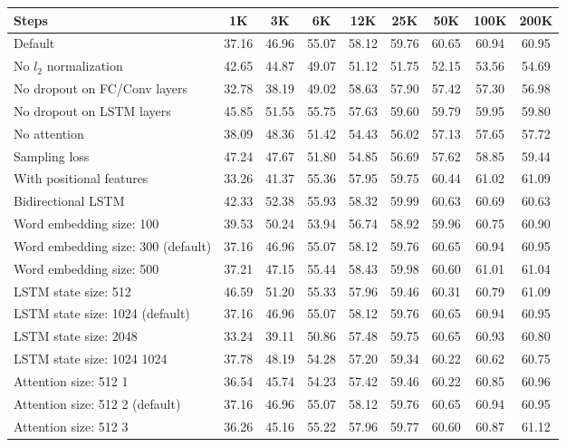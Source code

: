 \documentclass[10pt,twocolumn,letterpaper]{article}
\begin{document}
\begin{table*}
	\footnotesize
	\centering
	\tabcolsep=0.5cm
	\begin{tabular}{l c c c c c c c c}
		\toprule
		Steps &  1K & 3K & 6K & 12K & 25K & 50K & 100K & 200K \\
		\midrule
		Default & 37.16 & 46.96 & 55.07 & 58.12 & 59.76 & 60.65 & 60.94 & 60.95 \\
		No $l_2$ normalization & 42.65 & 44.87 & 49.07 & 51.12 & 51.75 & 52.15 & 53.56 & 54.69 \\
		No dropout on FC/Conv layers & 32.78 & 38.19 & 49.02 & 58.63 & 57.90 & 57.42 & 57.30 & 56.98 \\
		No dropout on LSTM layers & 45.85 & 51.55 & 55.75 & 57.63 & 59.60 & 59.79 & 59.95 & 59.80 \\
		No attention & 38.09 & 48.36 & 51.42 & 54.43 & 56.02 & 57.13 & 57.65 & 57.72 \\
		Sampling loss & 47.24 & 47.67 & 51.80 & 54.85 & 56.69 & 57.62 & 58.85 & 59.44 \\
		With positional features & 33.26 & 41.37 & 55.36 & 57.95 & 59.75 & 60.44 & 61.02 & 61.09 \\
		Bidirectional LSTM & 42.33 & 52.38 & 55.93 & 58.32 & 59.99 & 60.63 & 60.69 & 60.63 \\
		\midrule
		Word embedding size: 100 & 39.53 & 50.24 & 53.94 & 56.74 & 58.92 & 59.96 & 60.75 & 60.90 \\
		Word embedding size: 300 (default) & 37.16 & 46.96 & 55.07 & 58.12 & 59.76 & 60.65 & 60.94 & 60.95 \\
		Word embedding size: 500 & 37.21 & 47.15 & 55.44 & 58.43 & 59.98 & 60.60 & 61.01 & 61.04 \\
		\midrule
		LSTM state size: 512 & 46.59 & 51.20 & 55.33 & 57.96 & 59.46 & 60.31 & 60.79 & 61.09 \\
		LSTM state size: 1024 (default) & 37.16 & 46.96 & 55.07 & 58.12 & 59.76 & 60.65 & 60.94 & 60.95 \\
		LSTM state size: 2048 & 33.24 & 39.11 & 50.86 & 57.48 & 59.75 & 60.65 & 60.93 & 60.80 \\
		LSTM state size: 1024 1024 & 37.78 & 48.19 & 54.28 & 57.20 & 59.34 & 60.22 & 60.62 & 60.75 \\
		\midrule
		Attention size: 512 1 & 36.54 & 45.74 & 54.23 & 57.42 & 59.46 & 60.22 & 60.85 & 60.96 \\
		Attention size: 512 2 (default) & 37.16 & 46.96 & 55.07 & 58.12 & 59.76 & 60.65 & 60.94 & 60.95 \\
		Attention size: 512 3 & 36.26 & 45.16 & 55.22 & 57.96 & 59.77 & 60.60 & 60.87 & 61.12 \\

\end{tabular}
\end{table*}
\end{document}
